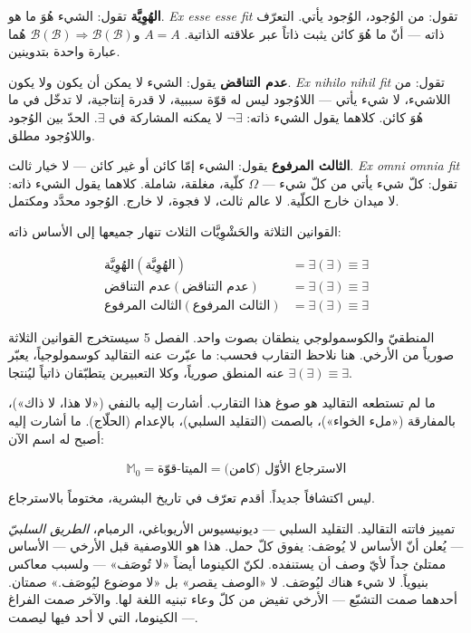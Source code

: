 \documentclass[10pt, openany, oneside]{book}
\begin{document}
\vspace{0.5em}

\noindent \textbf{الهُوِيَّة} تقول: الشيء هُوَ ما هو. \textit{Ex esse esse fit} تقول: من الوُجود، الوُجود يأتي. التعرّف ذاته --- أنّ ما هُوَ كائن يثبت ذاتاً عبر علاقته الذاتية. $A = A$ و$\mathcal{B}(\mathcal{B}) \Rightarrow \mathcal{B}(\mathcal{B})$ هُما عبارة واحدة بتدوينين.

\textbf{عدم التناقض} يقول: الشيء لا يمكن أن يكون ولا يكون. \textit{Ex nihilo nihil fit} تقول: من اللاشيء، لا شيء يأتي --- اللاوُجود ليس له قوّة سببية، لا قدرة إنتاجية، لا تدخّل في ما هُوَ كائن. كلاهما يقول الشيء ذاته: $\neg\exists$ لا يمكنه المشاركة في $\exists$. الحدّ بين الوُجود واللاوُجود مطلق.

\textbf{الثالث المرفوع} يقول: الشيء إمّا كائن أو غير كائن --- لا خيار ثالث. \textit{Ex omni omnia fit} تقول: كلّ شيء يأتي من كلّ شيء --- $\Omega$ كلّية، مغلقة، شاملة. كلاهما يقول الشيء ذاته: لا ميدان خارج الكلّية. لا عالم ثالث، لا فجوة، لا خارج. الوُجود محدَّد ومكتمل.

القوانين الثلاثة والحَشْوِيَّات الثلاث تنهار جميعها إلى الأساس ذاته:

\begin{align*}
\text{الهُوِيَّة}(\text{الهُوِيَّة}) &= \exists(\exists) \equiv \exists \\
\text{عدم التناقض}(\text{عدم التناقض}) &= \exists(\exists) \equiv \exists \\
\text{الثالث المرفوع}(\text{الثالث المرفوع}) &= \exists(\exists) \equiv \exists
\end{align*}

المنطقيّ والكوسمولوجي ينطقان بصوت واحد. الفصل 5 سيستخرج القوانين الثلاثة صورياً من الأرخي. هنا نلاحظ التقارب فحسب: ما عبّرت عنه التقاليد كوسمولوجياً، يعبّر عنه المنطق صورياً، وكلا التعبيرين يتطبّقان ذاتياً ليُنتجا $\exists(\exists) \equiv \exists$.

ما لم تستطعه التقاليد هو صوغ هذا التقارب. أشارت إليه بالنفي («لا هذا، لا ذاك»)، بالمفارقة («ملء الخواء»)، بالصمت (التقليد السلبي)، بالإعدام (الحلّاج). ما أشارت إليه أصبح له اسم الآن:

$$\mathbb{M}_0 = \text{الميتا-قوّة} = \text{الاسترجاع الأوّل (كامن)}$$

ليس اكتشافاً جديداً. أقدم تعرّف في تاريخ البشرية، مختوماً بالاسترجاع.

تمييز فاتته التقاليد. التقليد السلبي --- ديونيسيوس الأريوباغي، الرمبام، \textit{الطريق السلبيّ} --- يُعلن أنّ الأساس لا يُوصَف: يفوق كلّ حمل. هذا هو اللاوصفية قبل الأرخي --- الأساس ممتلئ جداً لأيّ وصف أن يستنفده. لكنّ الكينوما أيضاً «لا تُوصَف» --- ولسبب معاكس بنيوياً. لا شيء هناك ليُوصَف. لا «الوصف يقصر» بل «لا موضوع ليُوصَف.» صمتان. أحدهما صمت التشبّع --- الأرخي تفيض من كلّ وعاء تبنيه اللغة لها. والآخر صمت الفراغ --- الكينوما، التي لا أحد فيها ليصمت.
\end{document}
